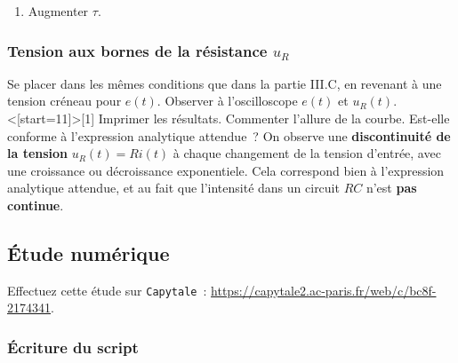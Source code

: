 \documentclass[../main/main.tex]{subfiles}
\begin{document}
\begin{enumerate}
	\item Augmenter $\tau$.
\end{enumerate}

\subsubsection{Tension aux bornes de la résistance $u_R$}

Se placer dans les mêmes conditions que dans la partie III.C, en revenant à une
tension créneau pour $e(t)$. Observer à l'oscilloscope $e(t)$ et $u_{R}(t)$.
\QR<[start=11]>[1]{%
	Imprimer les résultats. Commenter l'allure
	de la courbe. Est-elle conforme à l'expression analytique attendue~?
}{%
	On observe une \textbf{discontinuité de la tension} $u_R(t) = Ri(t)$ à chaque
	changement de la tension d'entrée, avec une croissance ou décroissance
	exponentiele. Cela correspond bien à l'expression analytique attendue, et au
	fait que l'intensité dans un circuit $RC$ n'est \textbf{pas continue}.
}

\subsection{Étude numérique}
Effectuez cette étude sur \texttt{Capytale}~:
\url{https://capytale2.ac-paris.fr/web/c/bc8f-2174341}.

\subsubsection{Écriture du script}

%
\end{document}
